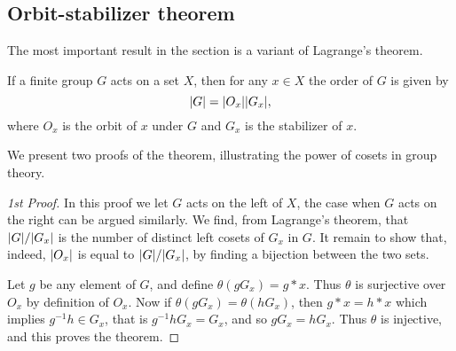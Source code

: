 \documentclass[main.tex]{subfiles}
\begin{document}
			\subsection{Orbit-stabilizer theorem}
			The most important result in the section is a variant of Lagrange's theorem.
			\begin{theorem}
				If a finite group $G$ acts on a set $X$, then for any $x \in X$ the order of $G$ is given by
				\begin{equation*}
				\lvert G\rvert = \lvert O_x\rvert \lvert G_x\rvert,
				\end{equation*}
			where $O_x$ is the orbit of $x$ under $G$ and $G_x$ is the stabilizer of $x$.
			\end{theorem}
			We present two proofs of the theorem, illustrating the power of cosets in group theory.
			\begin{proof}[1st Proof]
				In this proof we let $G$ acts on the left of $X$, the case when $G$ acts on the right can be argued similarly. We find, from Lagrange's theorem, that $\lvert G\rvert/\lvert G_x\rvert$ is the number of distinct left cosets of $G_x$ in $G$. It remain to show that, indeed, $\lvert O_x\rvert$ is equal to $\lvert G\rvert/\lvert G_x\rvert$, by finding a bijection between the two sets.
				
				Let $g$ be any element of $G$, and define $\theta(gG_x) = g\ast x$. Thus $\theta$ is surjective over $O_x$ by definition of $O_x$. Now if $\theta(gG_x) = \theta(hG_x)$, then $g\ast x = h \ast x$ which implies $g^{-1}h \in G_x$, that is $g^{-1}h G_x = G_x$, and so $gG_x = hG_x$. Thus $\theta$ is injective, and this proves the theorem.
			\end{proof}
\end{document}
